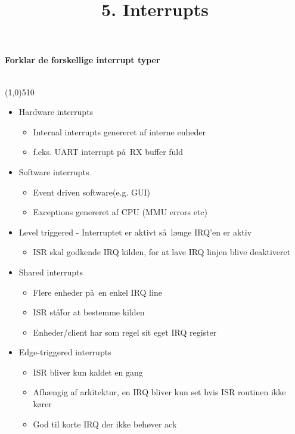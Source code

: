 \documentclass{paper}
\title{5. Interrupts}
\begin{document}
\maketitle
\begin{large}\textbf{Forklar de forskellige interrupt typer}\end{large}\\
\line(1,0){510}
\begin{itemize}
	\item Hardware interrupts
	\begin{itemize}
		\item Internal interrupts genereret af interne enheder
		\item f.eks. UART interrupt p\aa\ RX buffer fuld
	\end{itemize}
	\item Software interrupts
	\begin{itemize}
		\item Event driven software(e.g. GUI)
		\item Exceptions genereret af CPU (MMU errors etc)
	\end{itemize}
	\item Level triggered - Interruptet er aktivt s\aa\ l\ae nge IRQ'en er aktiv
	\begin{itemize}
		\item ISR skal godkende IRQ kilden, for at lave IRQ linjen blive deaktiveret
	\end{itemize}
	\item Shared interrupts
	\begin{itemize}
		\item Flere enheder p\aa\ en enkel IRQ line
		\item ISR st\aa\r for at bestemme kilden
		\item Enheder/client har som regel sit eget IRQ register
	\end{itemize}
	\item Edge-triggered interrupts
	\begin{itemize}
		\item ISR bliver kun kaldet en gang
		\item Afh\ae ngig af arkitektur, en IRQ bliver kun set hvis ISR routinen ikke k\o rer
		\item God til korte IRQ der ikke beh\o ver ack
	\end{itemize}
\end{itemize}
\end{document}

